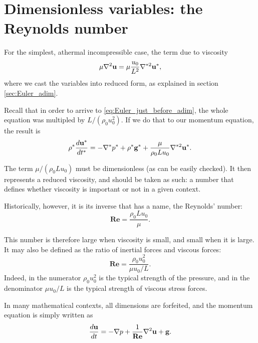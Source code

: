 \section{Dimensionless variables: the Reynolds number}

For the simplest, athermal incompressible case, the term due to
viscosity
\[
\mu \nabla^2 \mathbf{u} = \mu \frac{u_0}{L^2} \nabla^{*2} \mathbf{u}^* ,
\]
where we cast the variables into reduced form, as explained in
section \ref{sec:Euler_adim}.

Recall that in order to arrive to \ref{eq:Euler_just_before_adim}, the
whole equation was multipled by $L/(\rho_0 u_0^2)$. If we do that to our
momentum equation, the result is
\[
\rho^* \frac{d\mathbf{u}^* }{dt^* } =
-  \nabla^* p^*
+  \rho^* \mathbf{g}^* +
\frac{\mu }{\rho_ 0 L u_0 } \nabla^{*2} \mathbf{u}^* .
\]

The term $\mu /( \rho_ 0 L u_0)$ must be dimensionless (as can be
easily checked). It then represents a reduced viscosity, and should be
taken as such: a number that defines whether viscosity is important or
not in a given context.

Historically, however, it is its inverse that has a name, the
Reynolds' number:
\begin{equation}
  \mathbf{Re}= \frac{\rho_ 0 L u_0 }{\mu }.
\end{equation}

This number is therefore large when viscosity is small, and small when
it is large. It may also be defined as the ratio of inertial forces and
viscous forces:
\begin{equation}
  \mathbf{Re}= \frac{\rho_ 0 u^2_0 }{\mu u_0 / L }.
\end{equation}
Indeed, in the numerator $\rho_ 0 u^2_0$ is the typical strength of the
pressure, and in the denominator $\mu u_0 / L $ is the typical
strength of viscous stress forces.

In many mathematical contexts, all dimensions are forfeited, and the
momentum equation is simply written as
\begin{equation}
  \label{eq:NS_usual_reduced}
  \frac{d\mathbf{u} }{dt} =
  - \nabla p 
  + \frac{1}{\mathbf{Re}} \nabla^2 \mathbf{u}
  + \mathbf{g} .
\end{equation}



